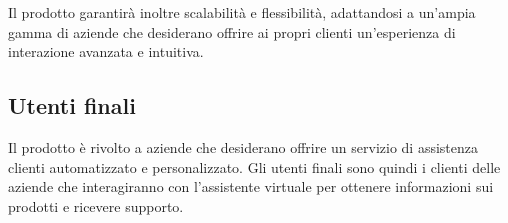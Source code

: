 Il prodotto garantirà inoltre scalabilità e flessibilità, adattandosi a un’ampia gamma di aziende che desiderano offrire ai propri clienti un’esperienza di interazione avanzata e intuitiva.

\subsection{Utenti finali}
Il prodotto è rivolto a aziende che desiderano offrire un servizio di assistenza 
clienti automatizzato e personalizzato. Gli utenti finali sono quindi i clienti 
delle aziende che interagiranno con l’assistente virtuale per ottenere 
informazioni sui prodotti e ricevere supporto.